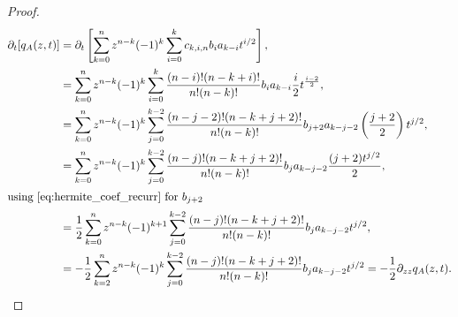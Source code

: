 \begin{proof}

        \begin{align*}
            \partial_t [q_A(z,t)] &= \partial_t \left[ \sum_{k=0}^n z^{n-k}(-1)^k \sum_{i=0}^k c_{k,i,n} b_i a_{k-i} t^{i/2} \right],\\ 
            &= \sum_{k=0}^n z^{n-k}(-1)^k \sum_{i=0}^k \frac{(n-i)!(n-k+i)!}{n!(n-k)!} b_i a_{k-i} \frac{i}{2}t^{\frac{i-2}{2}},\\ 
            &= \sum_{k=0}^n z^{n-k}(-1)^k \sum_{j=0}^{k-2} \frac{(n-j-2)!(n-k+j+2)!}{n!(n-k)!} b_{j+2}a_{k-j-2}\left( \frac{j+2}{2} \right)t^{j/2},\\ 
            &= \sum_{k=0}^n z^{n-k}(-1)^k \sum_{j=0}^{k-2} \frac{(n-j)!(n-k+j+2)!}{n!(n-k)!} b_ja_{k-j-2}\frac{(j+2)t^{j/2}}2,\\
            \intertext{using \eqref{eq:hermite_coef_recurr} for $b_{j+2}$} 
            &= \frac12 \sum_{k=0}^n z^{n-k}(-1)^{k+1} \sum_{j=0}^{k-2} \frac{(n-j)!(n-k+j+2)!}{n!(n-k)!} b_ja_{k-j-2}t^{j/2}, \\ 
            &= -\frac12 \sum_{k=2}^n z^{n-k}(-1)^{k} \sum_{j=0}^{k-2} \frac{(n-j)!(n-k+j+2)!}{n!(n-k)!} b_ja_{k-j-2}t^{j/2} = -\frac12 \partial_{zz} q_A(z,t).
        \end{align*}
    \end{proof}
    

